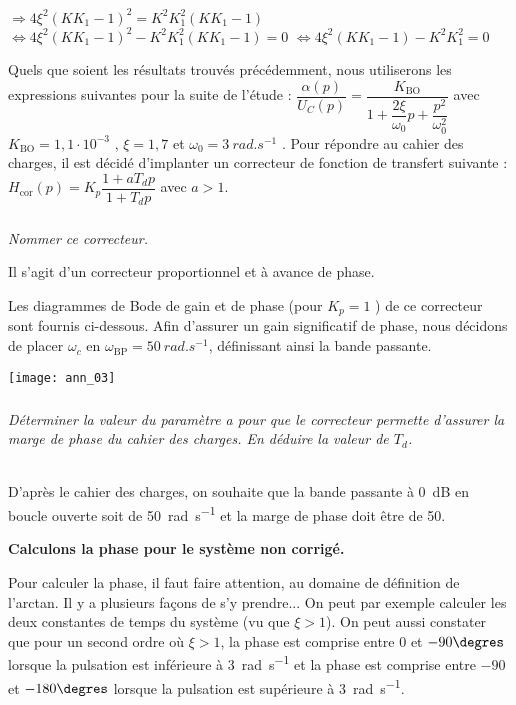 \begin{multicols}{2}
\begin{corrige}
 $\Rightarrow 4\xi^2 \left( K K_1-1 \right)^2 = K^2 K_1^2 \left(K K_1-1\right)$
  $\Leftrightarrow 4\xi^2 \left( K K_1-1 \right)^2 - K^2 K_1^2 \left(K K_1-1\right)=0$
    $\Leftrightarrow 4\xi^2 \left( K K_1-1 \right) - K^2 K_1^2 =0$
\end{corrige}
\else
\fi

\ifprof
\else
Quels que soient les résultats trouvés précédemment, nous utiliserons les expressions suivantes pour la suite
de l'étude : $\dfrac{\alpha (p)}{U_C(p)} = \dfrac{K_{\text{BO}}}{1+\dfrac{2\xi}{\omega_0}p+\dfrac{p^2}{\omega_0^2}}$
avec $K_{\text{BO}}=1,1\cdot 10^{-3}$ , $\xi=1,7$ et $\omega_0=\SI{3}{rad.s^{-1}}$ . Pour répondre au cahier des
charges, il est décidé d'implanter un correcteur de fonction de transfert suivante : $H_{\text{cor}} (p)=K_p \dfrac{1+aT_d p}{1+T_d p}$ avec $a>1$.

\fi

\subparagraph{} \textit{Nommer ce correcteur.}
\ifprof
\begin{corrige}
Il s'agit d'un correcteur proportionnel et à avance de phase. 
\end{corrige}
\else
\fi

\ifprof
\else
Les diagrammes de Bode de gain et de phase (pour $K_p=1$ ) de ce correcteur sont fournis ci-dessous. Afin
d'assurer un gain significatif de phase, nous décidons de placer $\omega_c$ en $\omega_{\text{BP}}=\SI{50}{rad.s^{-1}}$, définissant ainsi la bande passante.

\begin{center}
\texttt{[image: ann\_03]}
\end{center}

\fi

\subparagraph{} \textit{Déterminer la valeur du paramètre a pour que le correcteur permette d'assurer la marge de phase
du cahier des charges. En déduire la valeur de $T_d$.}
\ifprof
\begin{corrige} ~\\

D'après le cahier des charges, on souhaite que la bande passante à \SI{0}{dB} en boucle ouverte soit de \SI{50}{rad.s^{-1}} et la marge de phase doit être de 50\degres.

\textbf{Calculons la phase pour le système non corrigé.}

Pour calculer la phase, il faut faire attention, au domaine de définition de l'arctan. Il y a plusieurs façons de s'y prendre...
On peut par exemple calculer les deux constantes de temps du système (vu que $\xi>1$). On peut aussi constater que pour un second ordre où $\xi>1$, la phase est comprise entre 0 et $-90\degres$ lorsque la pulsation est inférieure à \SI{3}{rad.s^{-1}} et la phase est comprise entre $-90$ et $-180\degres$ lorsque la pulsation est supérieure à \SI{3}{rad.s^{-1}}. 


\end{corrige}
\end{multicols}
